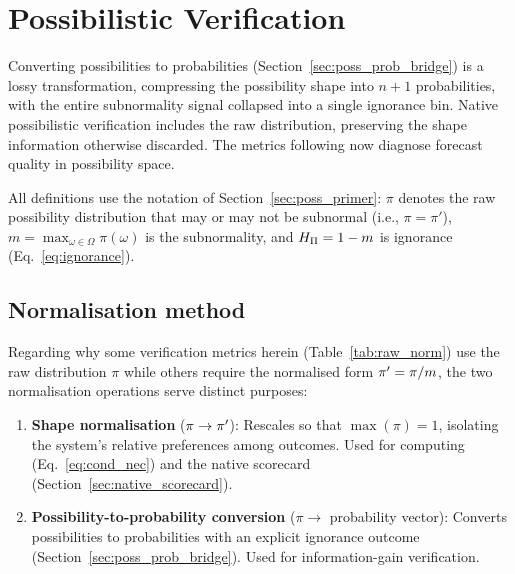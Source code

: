 
\section{Possibilistic Verification}\label{sec:native_verification}

Converting possibilities to probabilities
(Section~\ref{sec:poss_prob_bridge}) is a lossy
transformation, compressing the possibility shape
into $n{+}1$ probabilities, with the entire subnormality
signal collapsed into a single ignorance bin.
Native possibilistic verification includes the raw
distribution, preserving the shape information otherwise
discarded. The metrics following now diagnose forecast
quality in possibility space.

All definitions use the notation of Section~\ref{sec:poss_primer}:
$\pi$ denotes the raw possibility distribution that may
or may not be subnormal (i.e., $\pi = \pi'$),
$m = \max_{\omega \in \Omega} \pi(\omega)$ is the
subnormality, and
$H_{\Pi} = 1 - m$ is ignorance (Eq.~\ref{eq:ignorance}).

\subsection{Normalisation method}\label{sec:norm_protocol}

Regarding why some verification metrics herein
(Table~\ref{tab:raw_norm}) use the raw distribution
$\pi$ while others require the normalised form
$\pi' = \pi / m$, the two
normalisation operations serve distinct purposes:

\begin{enumerate}[leftmargin=2em]
\item \textbf{Shape normalisation} ($\pi \to \pi'$): Rescales so
    that $\max(\pi) = 1$, isolating the system's relative
    preferences among outcomes. Used for computing \Nc{}
    (Eq.~\ref{eq:cond_nec}) and the native scorecard
    (Section~\ref{sec:native_scorecard}).
\item \textbf{Possibility-to-probability conversion}
    ($\pi \to$ probability vector): Converts possibilities
    to probabilities with an explicit ignorance outcome
    (Section~\ref{sec:poss_prob_bridge}).
    Used for information-gain verification.
\end{enumerate}


